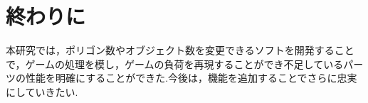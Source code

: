 \documentclass[twocolumn,10pt,a4j]{ltjsarticle}
\begin{document}
\vspace{-2mm}
\section{終わりに}
\vspace{-1mm}
本研究では，ポリゴン数やオブジェクト数を変更できるソフトを開発することで，ゲームの処理を模し，ゲームの負荷を再現することができ不足しているパーツの性能を明確にすることができた.今後は，機能を追加することでさらに忠実にしていきたい.
\end{document}
